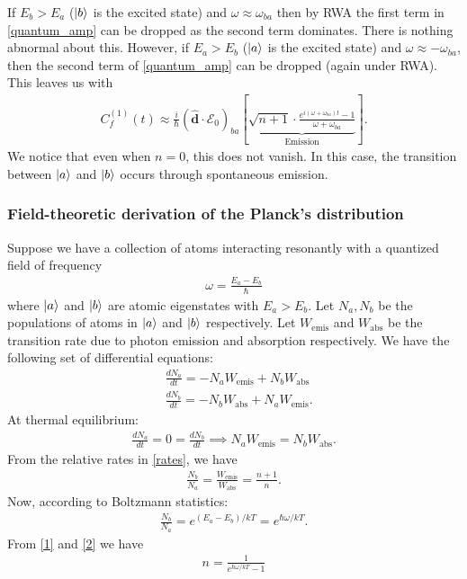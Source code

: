 \documentclass{book}
\theoremstyle{definition}
\newcommand{\f}[2]{\frac{#1}{#2}}
\newcommand{\lp}{\left(}
\newcommand{\rp}{\right)}
\newcommand{\lb}{\left[}
\newcommand{\rb}{\right]}
\begin{document}
If $E_b > E_a$ ($\ket{b}$ is the excited state) and $\omega \approx \omega_{ba}$ then by RWA the first term in \eqref{quantum_amp} can be dropped as the second term dominates. There is nothing abnormal about this. However, if $E_a > E_b$ ($\ket{a}$ is the excited state) and $\omega \approx -\omega_{ba}$, then the second term of \eqref{quantum_amp} can be dropped (again under RWA). This leaves us with
\begin{align}
C_f^{(1)}(t) \approx \f{i}{\hbar}\lp \hat{\mathbf{d}}\cdot\bm{\mathcal{E}}_0 \rp_{ba}
\lb \underbrace{\sqrt{n+1}\cdot\f{e^{i(\omega + \omega_{ba})t} - 1}{ \omega + \omega_{ba} }}_\text{Emission}\rb.
\end{align}
We notice that even when $n=0$, this does not vanish. In this case, the transition between $\ket{a}$ and $\ket{b}$ occurs through spontaneous emission. 




\subsubsection{Field-theoretic derivation of the Planck's distribution}

Suppose we have a collection of atoms interacting resonantly with a quantized field of frequency
\begin{align}
\omega = \f{E_a - E_b}{\hbar}
\end{align}
where $\ket{a}$ and $\ket{b}$ are atomic eigenstates with $E_a > E_b$. Let $N_a, N_b$ be the populations of atoms in $\ket{a}$ and $\ket{b}$ respectively. Let $W_\text{emis}$ and $W_\text{abs}$ be the transition rate due to photon emission and absorption respectively. We have the following set of differential equations:
\begin{align}
&\f{dN_a}{dt} = -N_a W_\text{emis} + N_b W_\text{abs}\\
&\f{dN_b}{dt} = -N_b W_\text{abs} + N_a W_\text{emis}.
\end{align}
At thermal equilibrium:
\begin{align}
\f{dN_a}{dt} = 0 = \f{dN_b}{dt} \implies N_a W_\text{emis} = N_b W_\text{abs}.
\end{align}
From the relative rates in \eqref{rates}, we have
\begin{align}\label{1}
\f{N_b}{N_a} = \f{W_\text{emis}}{W_\text{abs}} = \f{n+1}{n}.
\end{align}
Now, according to Boltzmann statistics:
\begin{align}\label{2}
\f{N_b}{N_a} = e^{(E_a - E_b)/kT} = e^{\hbar\omega /kT}. 
\end{align}
From \eqref{1} and \eqref{2} we have
\begin{align}
\boxed{n = \f{1}{e^{\hbar\omega/kT} - 1}}
\end{align}
\end{document}
